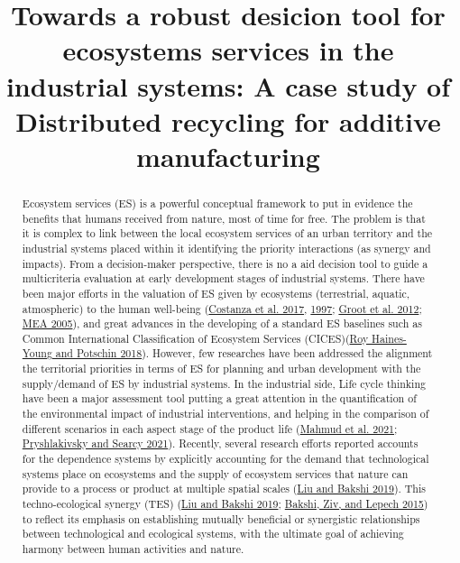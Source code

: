 \documentclass[
]{article}
\title{Towards a robust desicion tool for ecosystems services in the industrial systems: A case study of Distributed recycling for additive manufacturing}
\author{}
\date{\vspace{-2.5em}}
\begin{document}
\maketitle
\begin{abstract}
Ecosystem services (ES) is a powerful conceptual framework to put in evidence the benefits that humans received from nature, most of time for free.
The problem is that it is complex to link between the local ecosystem services of an urban territory and the industrial systems placed within it identifying the priority interactions (as synergy and impacts).
From a decision-maker perspective, there is no a aid decision tool to guide a multicriteria evaluation at early development stages of industrial systems.
There have been major efforts in the valuation of ES given by ecosystems (terrestrial, aquatic, atmospheric) to the human well-being (\protect\hyperlink{ref-Costanza2017}{Costanza et al. 2017}, \protect\hyperlink{ref-Costanza1997}{1997}; \protect\hyperlink{ref-DeGroot2012}{Groot et al. 2012}; \protect\hyperlink{ref-MEA2005}{MEA 2005}), and great advances in the developing of a standard ES baselines such as Common International Classification of Ecosystem Services (CICES)(\protect\hyperlink{ref-RoyHaines-Young2018}{Roy Haines-Young and Potschin 2018}).
However, few researches have been addressed the alignment the territorial priorities in terms of ES for planning and urban development with the supply/demand of ES by industrial systems.
In the industrial side, Life cycle thinking have been a major assessment tool putting a great attention in the quantification of the environmental impact of industrial interventions, and helping in the comparison of different scenarios in each aspect stage of the product life (\protect\hyperlink{ref-Mahmud2021}{Mahmud et al. 2021}; \protect\hyperlink{ref-Pryshlakivsky2021}{Pryshlakivsky and Searcy 2021}).
Recently, several research efforts reported accounts for the dependence systems by explicitly accounting for the demand that technological systems place on ecosystems and the supply of ecosystem services that nature can provide to a process or product at multiple spatial scales (\protect\hyperlink{ref-Liu2019g}{Liu and Bakshi 2019}).
This techno-ecological synergy (TES) (\protect\hyperlink{ref-Liu2019g}{Liu and Bakshi 2019}; \protect\hyperlink{ref-Bakshi2015}{Bakshi, Ziv, and Lepech 2015}) to reflect its emphasis on establishing mutually beneficial or synergistic relationships between technological and ecological systems, with the ultimate goal of achieving harmony between human activities and nature.

\end{abstract}
\end{document}
